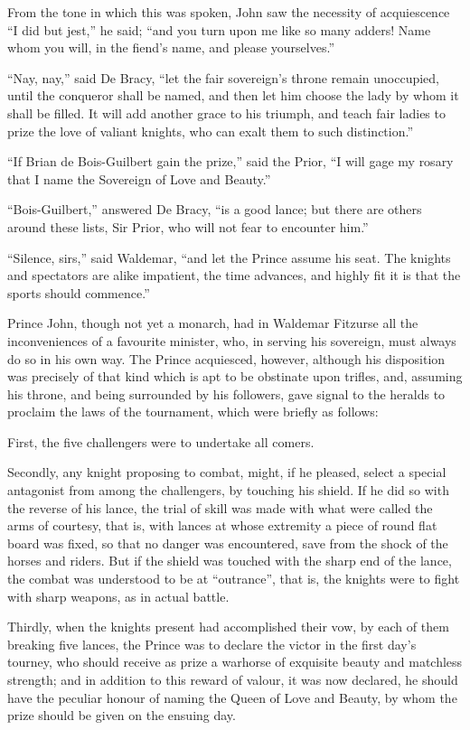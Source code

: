 From the tone in which this was spoken, John saw the necessity of
acquiescence ``I did but jest,'' he said; ``and you turn upon me like so
many adders! Name whom you will, in the fiend's name, and please
yourselves.''

``Nay, nay,'' said De Bracy, ``let the fair sovereign's throne remain
unoccupied, until the conqueror shall be named, and then let him choose
the lady by whom it shall be filled. It will add another grace to his
triumph, and teach fair ladies to prize the love of valiant knights, who
can exalt them to such distinction.''

``If Brian de Bois-Guilbert gain the prize,'' said the Prior, ``I will
gage my rosary that I name the Sovereign of Love and Beauty.''

``Bois-Guilbert,'' answered De Bracy, ``is a good lance; but there are
others around these lists, Sir Prior, who will not fear to encounter
him.''

``Silence, sirs,'' said Waldemar, ``and let the Prince assume his seat.
The knights and spectators are alike impatient, the time advances, and
highly fit it is that the sports should commence.''

Prince John, though not yet a monarch, had in Waldemar Fitzurse all the
inconveniences of a favourite minister, who, in serving his sovereign,
must always do so in his own way. The Prince acquiesced, however,
although his disposition was precisely of that kind which is apt to be
obstinate upon trifles, and, assuming his throne, and being surrounded
by his followers, gave signal to the heralds to proclaim the laws of the
tournament, which were briefly as follows:

First, the five challengers were to undertake all comers.

Secondly, any knight proposing to combat, might, if he pleased, select a
special antagonist from among the challengers, by touching his shield.
If he did so with the reverse of his lance, the trial of skill was made
with what were called the arms of courtesy, that is, with lances at
whose extremity a piece of round flat board was fixed, so that no danger
was encountered, save from the shock of the horses and riders. But if
the shield was touched with the sharp end of the lance, the combat was
understood to be at ``outrance'', that is, the knights were to fight
with sharp weapons, as in actual battle.

Thirdly, when the knights present had accomplished their vow, by each of
them breaking five lances, the Prince was to declare the victor in the
first day's tourney, who should receive as prize a warhorse of exquisite
beauty and matchless strength; and in addition to this reward of valour,
it was now declared, he should have the peculiar honour of naming the
Queen of Love and Beauty, by whom the prize should be given on the
ensuing day.

